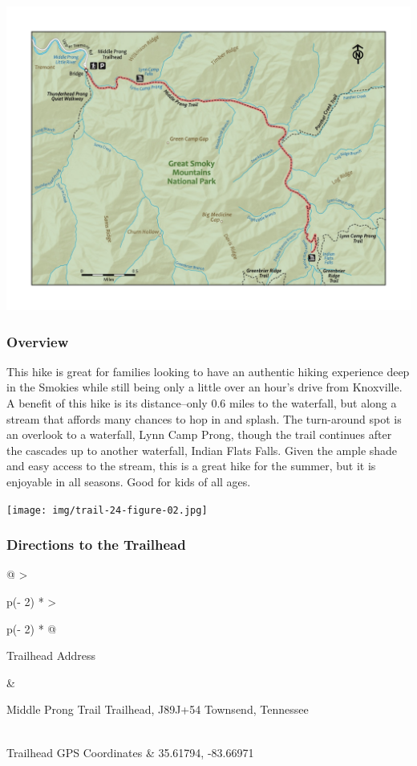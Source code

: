 \documentclass[
  letterpaper,
  DIV=11,
  numbers=noendperiod]{scrartcl}
\begin{document}
\includegraphics{maps/trail-24-map.jpeg}

\hypertarget{overview-23}{%
\subsubsection{Overview}\label{overview-23}}

This hike is great for families looking to have an authentic hiking
experience deep in the Smokies while still being only a little over an
hour's drive from Knoxville. A benefit of this hike is its
distance--only 0.6 miles to the waterfall, but along a stream that
affords many chances to hop in and splash. The turn-around spot is an
overlook to a waterfall, Lynn Camp Prong, though the trail continues
after the cascades up to another waterfall, Indian Flats Falls. Given
the ample shade and easy access to the stream, this is a great hike for
the summer, but it is enjoyable in all seasons. Good for kids of all
ages.

\texttt{[image: img/trail-24-figure-02.jpg]}

\hypertarget{directions-to-the-trailhead-23}{%
\subsubsection{Directions to the
Trailhead}\label{directions-to-the-trailhead-23}}

\begin{longtable}[]{@{}
  >{\raggedright\arraybackslash}p{(\columnwidth - 2\tabcolsep) * }
  >{\raggedright\arraybackslash}p{(\columnwidth - 2\tabcolsep) * }@{}}
\toprule\noalign{}
\begin{minipage}[b]{\linewidth}\raggedright
Trailhead Address
\end{minipage} & \begin{minipage}[b]{\linewidth}\raggedright
Middle Prong Trail Trailhead, J89J+54 Townsend, Tennessee
\end{minipage} \\
\midrule\noalign{}
\endhead
\bottomrule\noalign{}
\endlastfoot
Trailhead GPS Coordinates & 35.61794, -83.66971 \\
\end{longtable}
\end{document}
